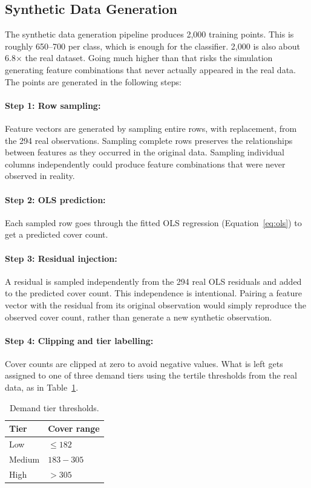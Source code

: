 \documentclass[12pt,a4paper,oneside]{article}
\begin{document}
\subsection{Synthetic Data Generation}
\label{sec:synth}

The synthetic data generation pipeline produces 2,000 training points. This is roughly 650–700 per class, which is enough for the classifier. 2,000 is also about 6.8$\times$ the real dataset. Going much higher than that risks the simulation generating feature combinations that never actually appeared in the real data. The points are generated in the following steps:

\paragraph{Step 1: Row sampling:} Feature vectors are generated by sampling entire rows, with replacement, from the 294 real observations. Sampling complete rows preserves the relationships between features as they occurred in the original data. Sampling individual columns independently could produce feature combinations that were never observed in reality.

\paragraph{Step 2: OLS prediction:} Each sampled row goes through the fitted OLS regression (Equation~\ref{eq:ols}) to get a predicted cover count.

\paragraph{Step 3: Residual injection:} A residual is sampled independently from the 294 real OLS residuals and added to the predicted cover count. This independence is intentional. Pairing a feature vector with the residual from its original observation would simply reproduce the observed cover count, rather than generate a new synthetic observation.

\paragraph{Step 4: Clipping and tier labelling:} Cover counts are clipped at zero to avoid negative values. What is left gets assigned to one of three demand tiers using the tertile thresholds from the real data, as in Table~\ref{tab:tier_counts}.

\begin{table}[H]
  \centering
  \begin{tabular}{@{}ll@{}}
  \toprule
  \textbf{Tier} & \textbf{Cover range} \\
  \midrule
  Low    & $\leq 182$   \\
  Medium & $183 - 305$  \\
  High   & $> 305$      \\
  \bottomrule
  \end{tabular}
  \caption{Demand tier thresholds.}
  \label{tab:tier_counts}
  \end{table}
\end{document}
